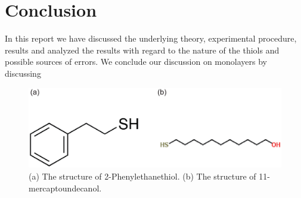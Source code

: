 \section{Conclusion}

In this report we have discussed the underlying theory, experimental procedure, results and analyzed the results with regard to the nature of the thiols and possible sources of errors.
We conclude our discussion on monolayers by discussing



\begin{figure}[h]
\centering
\includegraphics[width=0.9\columnwidth]{11mer.eps}
\caption{(a) The structure of 2-Phenylethanethiol. (b) The structure of 11-mercaptoundecanol. }
\label{11mer}
\end{figure}